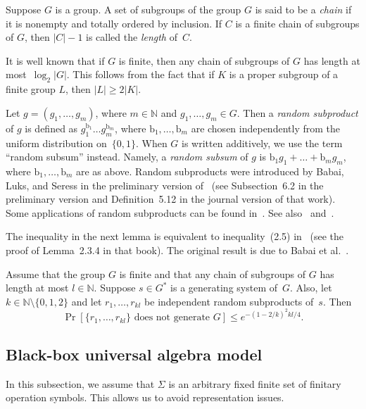 \documentclass{jgcc}
\newcommand{\B}{\{0,1\}}
\newcommand{\acl}[1]{\lvert#1\rvert}
\newcommand{\N}{\mathbb N}
\newcommand{\re}{\mathrm}
\newcommand{\Prob}[1]{\Pr[#1]}
\begin{document}
Suppose $G$ is a group. A set of subgroups of the group $G$
is said to be a \emph{chain} if it is nonempty and totally
ordered by inclusion. If $C$ is a finite chain of subgroups
of $G$, then $\acl C-1$ is called the \emph{length} of~$C$.

\begin{rem}
\label{r:lenofchofsubgr}
It is well known that if $G$ is finite, then any chain of
subgroups of $G$ has length at most~$\log_2\acl G$. This
follows from the fact that if $K$ is a proper subgroup of a
finite group $L$, then $\acl L\ge2\acl K$.
\end{rem}

Let $g=(g_1,\dots,g_m)$, where $m\in\N$ and
$g_1,\dots,g_m\in G$. Then a \emph{random subproduct} of $g$
is defined as $g_1^{\re b_1}\dots g_m^{\re b_m}$, where $\re
b_1,\dots,\re b_m$ are chosen independently from the uniform
distribution on~$\B$. When $G$ is written additively, we use
the term ``random subsum'' instead. Namely, a \emph{random
subsum} of $g$ is $\re b_1g_1+\dots+\re b_mg_m$, where $\re
b_1,\dots,\re b_m$ are as above. Random subproducts were
introduced by Babai, Luks, and Seress in the preliminary
version of~\cite{BLS97} (see Subsection~6.2 in the
preliminary version and Definition~5.12 in the journal
version of that work). Some applications of random
subproducts can be found in~\cite[Section~2]{BCFLS95}. See
also~\cite[Section~2.3]{Ser03} and~\cite[Section~2]{CF93}.

The inequality in the next lemma is equivalent to
inequality~(2.5) in~\cite{Ser03} (see the proof of
Lemma~2.3.4 in that book). The original result is due to
Babai et al.~\cite[Theorem~2.5 and its proof]{BCFLS95}.

\begin{lem}
\label{l:Prrandsubprdonotgen}
Assume that the group $G$ is finite and that any chain of
subgroups of $G$ has length at most $l\in\N$. Suppose $s\in
G^*$ is a generating system of~$G$. Also, let
$k\in\N\setminus\{0,1,2\}$ and let $r_1,\dots,r_{kl}$ be
independent random subproducts of~$s$. Then
\[
\Prob{\{r_1,\dots,r_{kl}\}\text{ does not generate }G}\le
e^{-(1-2/k)^2kl/4}.
\]
\end{lem}

\subsection{Black-box universal algebra model}
\label{ss:bbunivalgmodel}

In this subsection, we assume that $\Sigma$ is an arbitrary
fixed finite set of finitary operation symbols. This allows
us to avoid representation issues.
\end{document}
